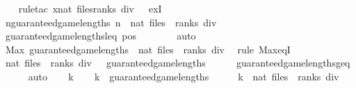 \begin{isabellebody}
\ \ \isamarkupfalse%
\ {\isacharparenleft}rule{\isacharunderscore}tac\ x{\isacharequal}{\isachardoublequoteopen}nat\ {\isacharparenleft}{\isacharparenleft}files{\isacharasterisk}ranks{\isacharparenright}\ div\ {}{\isacharparenright}{\isachardoublequoteclose}\ \ exI{\isacharparenright}\isanewline
\ \ \ \ \isamarkupfalse%
\ {\isachardoublequoteopen}{\isasymforall}n{\isasymin}guaranteed{\isacharunderscore}game{\isacharunderscore}lengths{\isachardot}\ n\ {\isasymle}\ nat\ {\isacharparenleft}files\ {\isacharasterisk}\ ranks\ div\ {}{\isacharparenright}{\isachardoublequoteclose}\isanewline
\ \ \ \ \ \ \isamarkupfalse%
\ guaranteed{\isacharunderscore}game{\isacharunderscore}lengths{\isacharunderscore}leq\ pos\isanewline
\ \ \ \ \ \ \isamarkupfalse%
\ auto\isanewline
\ \ \isamarkupfalse%
\isanewline
{}\isamarkupfalse%
%
\endisatagproof
{\isafoldproof}%
%
\isadelimproof
\isanewline
%
\endisadelimproof
\isanewline
{}\isamarkupfalse%
\ {\isachardoublequoteopen}Max\ guaranteed{\isacharunderscore}game{\isacharunderscore}lengths\ {\isacharequal}\ nat\ {\isacharparenleft}{\isacharparenleft}files\ {\isacharasterisk}\ ranks{\isacharparenright}\ div\ {}{\isacharparenright}{\isachardoublequoteclose}\isanewline
%
\isadelimproof
%
\endisadelimproof
%
\isatagproof
{}\isamarkupfalse%
\ {\isacharparenleft}rule\ Max{\isacharunderscore}eqI{\isacharparenright}\isanewline
\ \ \isamarkupfalse%
\ {\isachardoublequoteopen}nat\ {\isacharparenleft}{\isacharparenleft}files\ {\isacharasterisk}\ ranks{\isacharparenright}\ div\ {}{\isacharparenright}\ {\isasymin}\ guaranteed{\isacharunderscore}game{\isacharunderscore}lengths{\isachardoublequoteclose}\isanewline
\ \ \ \ \isamarkupfalse%
\ guaranteed{\isacharunderscore}game{\isacharunderscore}lengths{\isacharunderscore}geq\isanewline
\ \ \ \ \isamarkupfalse%
\ auto\isanewline
{}\isamarkupfalse%
\isanewline
\ \ \isamarkupfalse%
\ k\isanewline
\ \ \isamarkupfalse%
\ {\isachardoublequoteopen}k\ {\isasymin}\ guaranteed{\isacharunderscore}game{\isacharunderscore}lengths{\isachardoublequoteclose}\isanewline
\ \ \isamarkupfalse%
\ \isamarkupfalse%
\ {\isachardoublequoteopen}k\ {\isasymle}\ nat\ {\isacharparenleft}{\isacharparenleft}files\ {\isacharasterisk}\ ranks{\isacharparenright}\ div\ {}{\isacharparenright}{\isachardoublequoteclose}\isanewline

\end{isabellebody}

